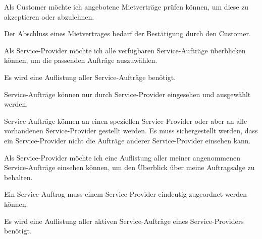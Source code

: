 \begin{tcolorbox}[colback=white,colframe=BrickRed!50!black, colbacktitle=BrickRed!75!black,title=\textbf{\underline{C5} Mietvertragsangebot prüfen}]
  \label{req:c5}
  \glqq Als Customer möchte ich angebotene Mietverträge prüfen können, um diese zu akzeptieren oder abzulehnen. \grqq
  \tcblower
  \begin{tcolorbox}[colback=white,colframe=white!50!black, colbacktitle=white!75!black,title=Task C5.1]
    Der Abschluss eines Mietvertrages bedarf der Bestätigung durch den Customer.
  \end{tcolorbox}
\end{tcolorbox}


\begin{tcolorbox}[colback=white,colframe=Aquamarine!50!black, colbacktitle=Aquamarine!75!black,title=\textbf{\underline{SP1} Ansicht verfügbarer Service-Aufträge}]
  \label{req:sp1}
  \glqq Als Service-Provider möchte ich alle verfügbaren Service-Aufträge überblicken können, um die passenden Aufträge auszuwählen. \grqq
  \tcblower
  \begin{tcolorbox}[colback=white,colframe=white!50!black, colbacktitle=white!75!black,title=Task SP1.1]
    Es wird eine Auflistung aller Service-Aufträge benötigt.
  \end{tcolorbox}
  \begin{tcolorbox}[colback=white,colframe=white!50!black, colbacktitle=white!75!black,title=Task SP1.2]
    Service-Aufträge können nur durch Service-Provider eingesehen und ausgewählt werden.
  \end{tcolorbox}
  \begin{tcolorbox}[colback=white,colframe=white!50!black, colbacktitle=white!75!black,title=Task SP1.2]
    Service-Aufträge können an einen speziellen Service-Provider oder aber an alle vorhandenen Service-Provider gestellt werden. Es muss sichergestellt werden, dass ein Service-Provider nicht die Aufträge anderer Service-Provider einsehen kann.
  \end{tcolorbox}
\end{tcolorbox}

\begin{tcolorbox}[colback=white,colframe=Aquamarine!50!black, colbacktitle=Aquamarine!75!black,title=\textbf{\underline{SP1} Ansicht angenommener Service-Aufträge}]
  \label{req:sp2}
  \glqq Als Service-Provider möchte ich eine Auflistung aller meiner angenommenen Service-Aufträge einsehen können, um den Überblick über meine Auftragsalge zu behalten. \grqq
  \tcblower
  \begin{tcolorbox}[colback=white,colframe=white!50!black, colbacktitle=white!75!black,title=Task SP1.1]
    Ein Service-Auftrag muss einem Service-Provider eindeutig zugeordnet werden können.
  \end{tcolorbox}
  \begin{tcolorbox}[colback=white,colframe=white!50!black, colbacktitle=white!75!black,title=Task SP1.1]
    Es wird eine Auflistung aller aktiven Service-Aufträge eines Service-Providers benötigt.
  \end{tcolorbox}
\end{tcolorbox}

